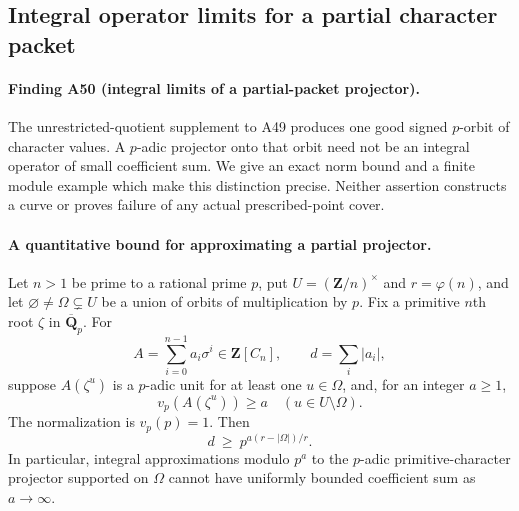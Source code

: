 \subsection{Integral operator limits for a partial character packet}
\label{sec:partial-packet-operators}

\paragraph{Finding A50 (integral limits of a partial-packet projector).}
The unrestricted-quotient supplement to A49 produces one good
signed $p$-orbit of character values. A $p$-adic projector onto
that orbit need not be an integral operator of small coefficient
sum. We give an exact norm bound and a finite module example
which make this distinction precise. Neither assertion constructs
a curve or proves failure of any actual prescribed-point cover.

\paragraph{A quantitative bound for approximating a partial projector.}
Let $n>1$ be prime to a rational prime $p$, put
$U=(\mathbf Z/n)^\times$ and $r=\varphi(n)$, and let
$\varnothing\ne\Omega\subsetneq U$ be a union of orbits of
multiplication by $p$. Fix a primitive $n$th root $\zeta$ in
$\overline{\mathbf Q}_p$. For
\[
 A=\sum_{i=0}^{n-1}a_i\sigma^i\in\mathbf Z[C_n],\qquad
                     d=\sum_i|a_i|,
 \tag{PP.1}
\]
suppose $A(\zeta^u)$ is a $p$-adic unit for at least one
$u\in\Omega$, and, for an integer $a\ge1$,
\[
                    v_p(A(\zeta^u))\ge a
                         \quad(u\in U\setminus\Omega).
 \tag{PP.2}
\]
The normalization is $v_p(p)=1$. Then
\[
                  d\ \ge\ p^{a(r-|\Omega|)/r}.
 \tag{PP.3}
\]
In particular, integral approximations modulo $p^a$ to the
$p$-adic primitive-character projector supported on $\Omega$
cannot have uniformly bounded coefficient sum as $a\to\infty$.

